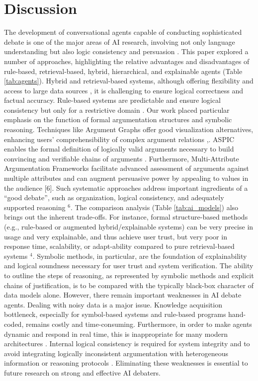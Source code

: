 \documentclass[conference]{IEEEtran}
\begin{document}
\section{Discussion}
The development of conversational agents capable of conducting sophisticated debate is one of the major areas of AI research, involving not only language understanding but also logic consistency and persuasion \cite{rakshit2019debbie}. This paper explored a number of approaches, highlighting the relative advantages and disadvantages of rule-based, retrieval-based, hybrid, hierarchical, and explainable agents (Table \ref{tab:agents}). Hybrid and retrieval-based systems, although offering flexibility and access to large data sources \cite{kulatska2019arguebot}, it is challenging to ensure logical correctness and factual accuracy. Rule-based systems are predictable and ensure logical consistency but only for a restrictive domain \cite{montealto2021rulebased}.
Our work placed particular emphasis on the function of formal argumentation structures and symbolic reasoning. Techniques like Argument Graphs offer good visualization alternatives, enhancing users' comprehensibility of complex argument relations \cite{chalaguine2020persuasive},\cite{engelmann2022argumentation}. ASPIC enables the formal definition of logically valid arguments necessary to build convincing and verifiable chains of arguments \cite{engelmann2022argumentation}. Furthermore, Multi-Attribute Argumentation Frameworks facilitate advanced assessment of arguments against multiple attributes and can augment persuasive power by appealing to values in the audience [6]. Such systematic approaches address important ingredients of a ``good debate'', such as organization, logical consistency, and adequately supported reasoning 
\footnotetext[6]{\label{debatingforeveryonejudge}\debatingforeveryonejudge}$^6$.
The comparison analysis (Table \ref{tab:ai_models}) also brings out the inherent trade-offs. For instance, formal structure-based methods (e.g., rule-based or augmented hybrid/explainable systems) can be very precise in usage and very explainable, and thus achieve user trust, but very poor in response time, scalability, or adapt-ability compared to pure retrieval-based systems $^4$. %
Symbolic methods, in particular, are the foundation of explainability and logical soundness necessary for user trust and system verification. The ability to outline the steps of reasoning, as represented by symbolic methods and explicit chains of justification, is to be compared with the typically black-box character of data models alone.
However, there remain important weaknesses in AI debate agents. Dealing with noisy data is a major issue. Knowledge acquisition bottleneck, especially for symbol-based systems and rule-based programs hand-coded, remains costly and time-consuming. Furthermore, in order to make agents dynamic and respond in real time, this is inappropriate for many modern architectures \cite{kasif2024trilogy}. Internal logical consistency is required for system integrity and to avoid integrating logically inconsistent argumentation with heterogeneous information or reasoning protocols \cite{ilkou2020symbolic}. Eliminating these weaknesses is essential to future research on strong and effective AI debaters.
\end{document}
